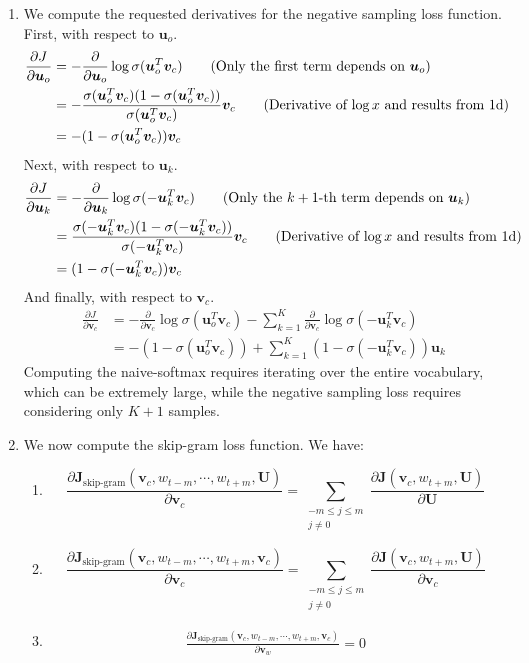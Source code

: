 \documentclass[12pt]{article}
\begin{document}
\begin{enumerate}[label=(\alph*)]
\item We compute the requested derivatives for the negative sampling loss function. First, with respect to $\bm{u}_o$.
\begin{align*}
\frac{\partial J}{\partial \bm{u}_o} &= - \frac{\partial}{\partial \bm{u}_o} \log \sigma(\bm{u}_o^T \bm{v}_c)  \tag{Only the first term depends on $\bm{u}_o$} \\
&= -\frac{\sigma(\bm{u}_o^T \bm{v}_c)(1 - \sigma(\bm{u}_o^T \bm{v}_c))}{\sigma(\bm{u}_o^T\bm{v}_c)} \bm{v}_c \tag{Derivative of $\log x$ and results from 1d} \\
&= -(1 - \sigma(\bm{u}_o^T \bm{v}_c)) \bm{v}_c
\end{align*}
Next, with respect to $\bm{u}_k$.
\begin{align*}
\frac{\partial J}{\partial \bm{u}_k} &= - \frac{\partial}{\partial \bm{u}_k} \log \sigma(-\bm{u}_k^T \bm{v}_c)  \tag{Only the $k+1$-th term depends on $\bm{u}_k$} \\
&= \frac{\sigma(-\bm{u}_k^T \bm{v}_c)(1 - \sigma(-\bm{u}_k^T \bm{v}_c))}{\sigma(-\bm{u}_k^T\bm{v}_c)} \bm{v}_c \tag{Derivative of $\log x$ and results from 1d} \\
&= (1 - \sigma(-\bm{u}_k^T \bm{v}_c)) \bm{v}_c
\end{align*}
And finally, with respect to $\bm{v}_c$.
\begin{align*}
\frac{\partial J}{\partial \bm{v}_c} &= - \frac{\partial}{\partial \bm{v}_c} \log \sigma(\bm{u}_o^T \bm{v}_c) - \sum_{k=1}^K \frac{\partial}{\partial \bm{v}_c} \log \sigma(-\bm{u}_k^T \bm{v}_c)  \\
&= -(1 - \sigma(\bm{u}_o^T \bm{v}_c)) + \sum_{k=1}^K (1 - \sigma(-\bm{u}_k^T \bm{v}_c)) \bm{u}_k \tag{Previous results} 
\end{align*}
Computing the naive-softmax requires iterating over the entire vocabulary, which can be extremely large, while the negative sampling loss requires considering only $K+1$ samples.

\item We now compute the skip-gram loss function. We have:
\begin{enumerate}[label=\roman*]
  \item 
  $$
  \frac{\partial \bm{J}_{\text{skip-gram}}(\bm{v}_c, w_{t-m}, \cdots, w_{t+m}, \bm{U})}{\partial \bm{v}_c } = \sum_{\substack{-m \leq j \leq m \\ j \neq 0}} \frac{\partial \bm{J}(\bm{v}_c, w_{t+m}, \bm{U}) }{\partial \bm{U}}
  $$
  \item 
  $$
  \frac{\partial \bm{J}_{\text{skip-gram}}(\bm{v}_c, w_{t-m}, \cdots, w_{t+m}, \bm{v}_c)}{\partial \bm{v}_c } = \sum_{\substack{-m \leq j \leq m \\ j \neq 0}} \frac{\partial \bm{J}(\bm{v}_c, w_{t+m}, \bm{U}) }{\partial \bm{v}_c}
  $$
  \item
  \begin{align*}
  \frac{\partial \bm{J}_{\text{skip-gram}}(\bm{v}_c, w_{t-m}, \cdots, w_{t+m}, \bm{v}_c)}{\partial \bm{v}_w }  = 0 \tag{$w \neq c$}
  \end{align*}
\end{enumerate}
\end{enumerate}
\end{document}
